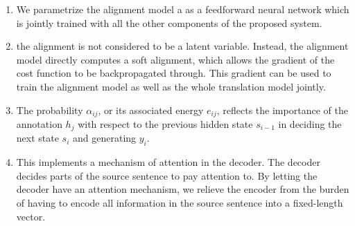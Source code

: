 \begin{enumerate}
    \item  We parametrize the alignment model a as a feedforward neural network which is jointly trained with all the other components of the proposed system.
    \hfill \cite{adv-ml-tech/paper/arxiv.org/1409.0473}

    \item the alignment is not considered to be a latent variable.
    Instead, the alignment model directly computes a soft alignment, which allows the gradient of the cost function to be backpropagated through.
    This gradient can be used to train the alignment model as well as the whole translation model jointly.
    \hfill \cite{adv-ml-tech/paper/arxiv.org/1409.0473}

    \item The probability $\alpha_{ij}$, or its associated energy $e_{ij}$, reflects the importance of the annotation $h_j$ with respect to the previous hidden state $s_{i-1}$ in deciding the next state $s_i$ and generating $y_i$.
    \hfill \cite{adv-ml-tech/paper/arxiv.org/1409.0473}

    \item This implements a mechanism of attention in the decoder.
    The decoder decides parts of the source sentence to pay attention to.
    By letting the decoder have an attention mechanism, we relieve the encoder from the burden of having to encode all information in the source sentence into a fixed-length vector.
    \hfill \cite{adv-ml-tech/paper/arxiv.org/1409.0473}


\end{enumerate}

























